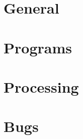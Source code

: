 \documentclass{article}
\begin{document}
\section{General}
\clearpage


\section{Programs}







\clearpage

\section{Processing}

\clearpage

\section{Bugs}\label{bugs}

\clearpage

\printindex
\end{document}
